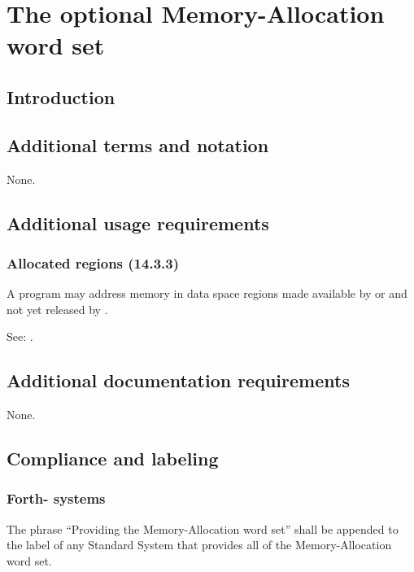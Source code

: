 
\chapter{The optional Memory-Allocation word set} %

\section{Introduction} %

\section{Additional terms and notation} %
None.

\section{Additional usage requirements} %

\setcounter{subsection}{2}
\subsection{Allocated regions (14.3.3)} %

A program may address memory in data space regions made available
by  or  and not yet released by .

See: .


\section{Additional documentation requirements} %
\label{mem:docs}

None.

\section{Compliance and labeling} %

\subsection{Forth-\snapshot{} systems} %

The phrase ``Providing the Memory-Allocation word set'' shall be
appended to the label of any Standard System that provides all of
the Memory-Allocation word set.

